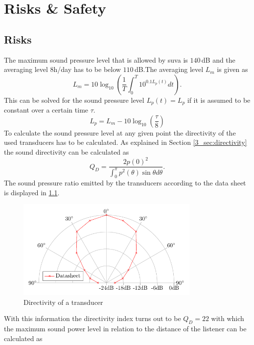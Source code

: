 \chapter{Risks \& Safety}
\section{Risks}
The maximum sound pressure level that is allowed by \acrshort{suva} is $140 \,$dB and the averaging level 8h/day has to be below $110 \,$dB.The averaging level $L_m$ is given as
\begin{equation}\label{5_Safety_eq:AveragingLevel}
    L_m = 10 \log_{10} \left (  \frac{1}{T} \int_0^T 10^{0.1 L_p(t)}dt\right ).
\end{equation}
This can be solved for the sound pressure level $L_p(t) = L_p$ if it is assumed to be constant over a certain time $\tau$.
\begin{equation}\label{5_Safety_eq:AveragingLevel_SPL}
    L_p = L_m - 10\log_{10}\left ( \frac{\tau}{8} \right )
\end{equation}
To calculate the sound pressure level at any given point the directivity of the used transducers has to be calculated. As explained in Section \ref{3_sec:directivity} the sound directivity can be calculated as
\begin{equation}\label{5_Safety_eq:Directivity}
    Q_D = \frac{2 p(0)^2}{\int_{0}^{\pi}p^2(\theta)\sin{\theta}d\theta}. 
\end{equation}
The sound pressure ratio emitted by the transducers according to the data sheet is displayed in \ref{5_fig:directivity_transducer}.
\begin{figure}
    \centering
    \includegraphics[width=0.8\textwidth]{images/5_Safety_Risks/Polar_PlotDirectivity.pdf}
    \caption{Directivity of a transducer}
    \label{5_fig:directivity_transducer}
\end{figure}
With this information the directivity index turns out to be $Q_D = 22$ with which the maximum sound power level in relation to the distance of the listener can be calculated as
